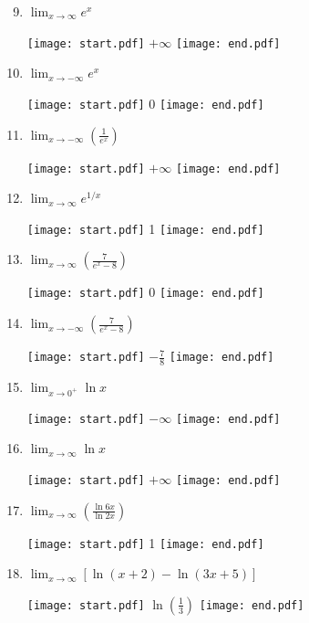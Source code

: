 \documentclass[12pt]{article}
\begin{document}
\begin{enumerate}
\setcounter{enumi}{8}

\item  $\displaystyle \lim_{x\rightarrow \infty}{e^{x}}$ 

\texttt{[image: start.pdf]}
{{$+\infty$}}
\texttt{[image: end.pdf]}


\item  $\displaystyle \lim_{x\rightarrow -\infty}{e^x}$ 

\texttt{[image: start.pdf]}
{{0}}
\texttt{[image: end.pdf]}


\item  $\displaystyle \lim_{x\rightarrow -\infty}{\left(\frac{1}{e^x}\right)}$ 

\texttt{[image: start.pdf]}
{{$+\infty$}}
\texttt{[image: end.pdf]}


\item  $\displaystyle \lim_{x\rightarrow \infty} e^{1/x}$ 

\texttt{[image: start.pdf]}
{{1}}
\texttt{[image: end.pdf]}


\item $\displaystyle \lim_{x \rightarrow \infty}{\left(\frac{7}{e^x-8}\right)}$

\texttt{[image: start.pdf]}
{{0}}
\texttt{[image: end.pdf]}


\item $\displaystyle \lim_{x \rightarrow -\infty}{\left(\frac{7}{e^x-8}\right)}$

\texttt{[image: start.pdf]}
{{$\displaystyle -\frac{7}{8}$}}
\texttt{[image: end.pdf]}


\item $\displaystyle \lim_{x\rightarrow 0^+}{\ln{x}}$ 

\texttt{[image: start.pdf]}
{{$-\infty$}}
\texttt{[image: end.pdf]}


\item  $\displaystyle \lim_{x\rightarrow \infty}{\ln{x}}$ 

\texttt{[image: start.pdf]}
{{$+\infty$}}
\texttt{[image: end.pdf]}


\item $\displaystyle \lim_{x\rightarrow \infty}{\left(\frac{\ln{6x}}{\ln{2x}}\right)}$

\texttt{[image: start.pdf]}
{{1}}
\texttt{[image: end.pdf]}


\item $\displaystyle \lim_{x\rightarrow \infty}{\left[\ln{(x+2)}-\ln{(3x+5)}\right]}$

\texttt{[image: start.pdf]}
{{$\displaystyle \ln{\left(\frac{1}{3}\right)}$}}
\texttt{[image: end.pdf]}


\end{enumerate}
\end{document}
